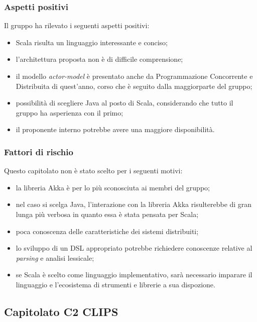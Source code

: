 \documentclass[12pt,a4paper]{article}
\begin{document}
\subsubsection{Aspetti positivi}

Il gruppo ha rilevato i seguenti aspetti positivi:

\begin{itemize}
\item Scala risulta un linguaggio interessante e conciso;
\item l'architettura proposta non è di difficile comprensione;
\item il modello \textit{actor-model} è presentato anche da Programmazione Concorrente e Distribuita di quest'anno, corso che è seguito dalla maggiorparte del gruppo;
\item possibilità di scegliere Java al posto di Scala, considerando che tutto il gruppo ha asperienza con il primo;
\item il proponente interno potrebbe avere una maggiore disponibilità.
\end{itemize}

\subsubsection{Fattori di rischio}

Questo capitolato non è stato scelto per i seguenti motivi:

\begin{itemize}
\item la libreria Akka è per lo più sconosciuta ai membri del gruppo;
\item nel caso si scelga Java, l'interazione con la libreria Akka risulterebbe di gran lunga più verbosa
in quanto essa è stata pensata per Scala;
\item poca conoscenza delle caratteristiche dei sistemi distribuiti;
\item lo sviluppo di un DSL appropriato potrebbe richiedere conoscenze relative al \textit{parsing} e 
analisi lessicale;
\item se Scala è scelto come linguaggio implementativo, sarà necessario imparare il linguaggio e l'ecosistema
di strumenti e librerie a sua dispozione.
\end{itemize}

\newpage

\subsection{Capitolato C2 CLIPS}
\end{document}
